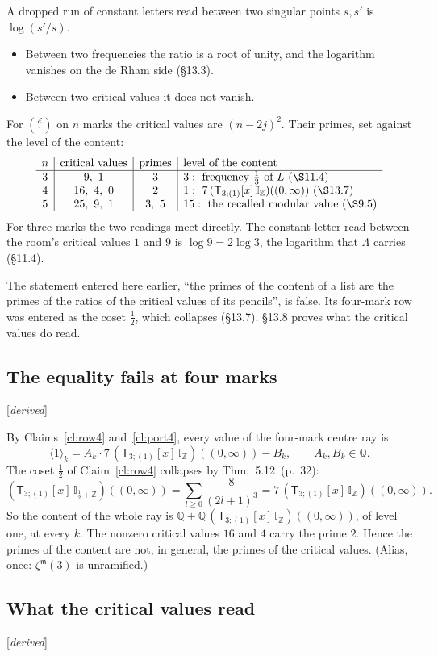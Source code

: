 \documentclass[11pt]{article}
\newcommand{\cE}{\mathcal E}
\newcommand{\sT}{\mathsf T}
\newcommand{\IZ}{\mathbb I_{\mathbb Z}}
\newcommand{\Ilat}[1]{\mathbb I_{#1}}
\newcommand{\Tx}[3]{(\sT_{#1;(1)}[x]\,#2)((#3,\infty))}
\newcommand{\status}[1]{\hfill{\small[\textit{#1}]}}
\newcommand{\hb}[2]{#1~(p.~#2)}   %
\theoremstyle{plain}
\theoremstyle{remark}
\begin{document}
A dropped run of constant letters read between two singular points $s,s'$ is $\log(s'/s)$.
\begin{itemize}
\item Between two frequencies the ratio is a root of unity, and the logarithm vanishes on the de Rham side (\S13.3).
\item Between two critical values it does not vanish.
\end{itemize}
For $\binom{\cE}1$ on $n$ marks the critical values are $(n-2j)^2$. Their primes, set against the level of the content:
\[
\begin{array}{c|c|c|l}
n&\text{critical values}&\text{primes}&\text{level of the content}\\\hline
3&9,\ 1&3&3:\ \text{frequency }\tfrac13\text{ of }L\ (\S11.4)\\
4&16,\ 4,\ 0&2&1:\ 7\,\Tx3{\IZ}0\ (\S13.7)\\
5&25,\ 9,\ 1&3,\ 5&15:\ \text{the recalled modular value }(\S9.5)
\end{array}
\]
For three marks the two readings meet directly. The constant letter read between the room's critical values $1$ and $9$ is $\log 9=2\log 3$, the logarithm that $\Lambda$ carries (\S11.4).

The statement entered here earlier, ``the primes of the content of a list are the primes of the ratios of the critical values of its pencils'', is false. Its four-mark row was entered as the coset $\frac12$, which collapses (\S13.7). \S13.8 proves what the critical values do read.

\subsection{The equality fails at four marks}\status{derived}

By Claims~\ref{cl:row4} and~\ref{cl:port4}, every value of the four-mark centre ray is
\[
\langle1\rangle_k=A_k\cdot 7\,\Tx3{\IZ}0-B_k,\qquad A_k,B_k\in\mathbb Q .
\]
The coset $\frac12$ of Claim~\ref{cl:row4} collapses by Thm.~\hb{5.12}{32}:
\[
\Tx3{\Ilat{\frac12+\mathbb Z}}0=\sum_{l\ge0}\frac8{(2l+1)^3}=7\,\Tx3{\IZ}0 .
\]
So the content of the whole ray is $\mathbb Q+\mathbb Q\,\Tx3{\IZ}0$, of level one, at every $k$. The nonzero critical values $16$ and $4$ carry the prime $2$. Hence the primes of the content are not, in general, the primes of the critical values. (Alias, once: $\zeta^{\mathfrak m}(3)$ is unramified.)

\subsection{What the critical values read}\status{derived}
\end{document}
